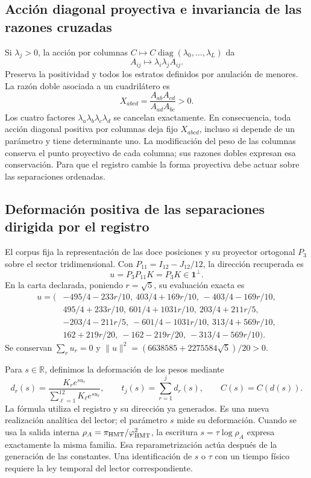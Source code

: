 \documentclass[a4paper,10pt]{article}
\theoremstyle{definition}\newtheorem{definition}[theorem]{Definición}
\theoremstyle{remark}\newtheorem{remark}[theorem]{Observación}
\numberwithin{equation}{section}
\begin{document}
\subsection{Acción diagonal proyectiva e invariancia de las razones cruzadas}

Si \(\lambda_j>0\), la acción por columnas
\(C\mapsto C\operatorname{diag}(\lambda_0,\ldots,\lambda_L)\) da
\[
 A_{ij}\longmapsto\lambda_i\lambda_j A_{ij}.
\]
Preserva la positividad y todos los estratos definidos por anulación de
menores. La razón doble asociada a un cuadrilátero es
\begin{equation}
 X_{abcd}=\frac{A_{ab}A_{cd}}{A_{ad}A_{bc}}>0.
 \label{eq:nc-crossratio}
\end{equation}
Los cuatro factores \(\lambda_a\lambda_b\lambda_c\lambda_d\) se
cancelan exactamente. En consecuencia, toda acción diagonal positiva por
columnas deja fijo \(X_{abcd}\), incluso si depende de un parámetro y
tiene determinante uno. La modificación del peso de las columnas conserva
el punto proyectivo de cada columna; sus razones dobles expresan esa
conservación. Para que el registro cambie la forma proyectiva debe actuar
sobre las separaciones ordenadas.

\subsection{Deformación positiva de las separaciones dirigida por el registro}

El corpus fija la representación de las doce posiciones y su proyector
ortogonal \(P_3\) sobre el sector tridimensional. Con
\(P_{11}=I_{12}-J_{12}/12\), la dirección recuperada es
\[
 u=P_3P_{11}K=P_3K\in\mathbf1^\perp.
\]
En la carta declarada, poniendo \(r=\sqrt5\), su evaluación exacta es
\begin{align*}
u=(&-495/4-233r/10,\ 403/4+169r/10,\ -403/4-169r/10,\\
   &495/4+233r/10,\ 601/4+1031r/10,\ 203/4+211r/5,\\
   &-203/4-211r/5,\ -601/4-1031r/10,\ 313/4+569r/10,\\
   &162+219r/20,\ -162-219r/20,\ -313/4-569r/10).
\end{align*}
Se conservan \(\sum_ru_r=0\) y
\(\|u\|^2=(6638585+2275584\sqrt5)/20>0\).

Para \(s\in\mathbb R\), definimos la deformación de los pesos mediante
\begin{equation}
 d_r(s)=\frac{K_re^{su_r}}{\sum_{\ell=1}^{12}K_\ell e^{su_\ell}},
 \qquad t_j(s)=\sum_{r=1}^jd_r(s),\qquad C(s)=C(d(s)).
 \label{eq:nc-gap-flow}
\end{equation}
La fórmula utiliza el registro y su dirección ya generados. Es una nueva
realización analítica del lector; el parámetro \(s\) mide su deformación.
Cuando se usa la salida interna \(\rho_A=\pi_{\rm HMT}/\varphi_{\rm HMT}^2\),
la escritura \(s=\tau\log\rho_A\) expresa exactamente la misma familia.
Esa reparametrización actúa después de la generación de las constantes.
Una identificación de \(s\) o \(\tau\) con un tiempo físico requiere la
ley temporal del lector correspondiente.
\end{document}
